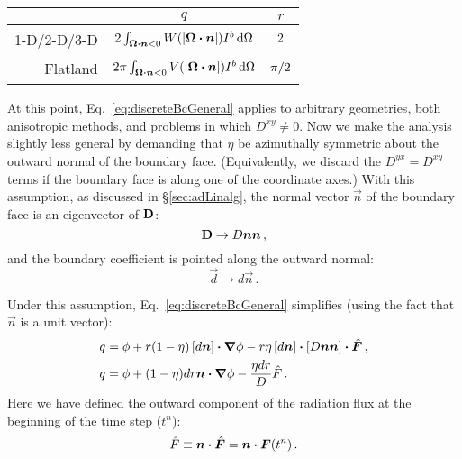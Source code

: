 \begin{table}[tb]
  \centering
  \begin{tabular}{rcc}
\toprule
& $q$
& $r$
\\ \midrule
1-D/2-D/3-D
& $2 \int_{\bm{\Omega}\bm{\cdot}\bm{n} < 0}
  W(\left| \bm{\Omega}\bm{\cdot}\bm{n} \right|) I^b \mathop{}\!\mathrm{d}\Omega$
  & $2\vphantom{\Big|}$
\\
Flatland
& $2 \pi \int_{\bm{\Omega}\bm{\cdot}\bm{n} < 0}
  V(\left| \bm{\Omega}\bm{\cdot}\bm{n} \right|) I^b \mathop{}\!\mathrm{d}\Omega$
& $\pi/2\vphantom{\Big|}$
\\ \bottomrule
  \end{tabular}
  \label{tab:discreteBcCoeffs}
\end{table}

At this point, Eq.~\eqref{eq:discreteBcGeneral} applies to arbitrary geometries,
both anisotropic methods, and problems in which $D^{xy} \ne 0$.
Now we make the analysis slightly less general by demanding
that $\eta$ be azimuthally symmetric about the outward normal of the boundary face.
(Equivalently, we discard the $D^{yx}=D^{xy}$ terms if the boundary face is
along one of the coordinate axes.) With this assumption, as discussed in
\S\ref{sec:adLinalg}, the normal vector $\vec{n}$ of the boundary face is an
eigenvector of $\mathbf{D}$:
\begin{equation*}
  \mathbf{D} \to D \bm{n}\bm{n}\,,
\end{equation*}
and the boundary coefficient is pointed along the outward normal:
\begin{equation*}
  \vec{d} \to d \vec{n}\,.
\end{equation*}

Under this assumption, Eq.~\eqref{eq:discreteBcGeneral} simplifies
(using the fact that $\vec{n}$ is a unit vector):
\begin{align} \nonumber
  q &= \phi + r (1 - \eta) \left[ d \bm{n} \right] \bm{\cdot} \bm{\nabla} \phi
  - r \eta \left[ d \bm{n} \right] \bm{\cdot} \left[ D \bm{n}\bm{n} \right] \bm{\cdot}
  \hat{\bm{F}}\,,
  \\ \label{eq:discreteBcGeneralQ}
 q &=  \phi + (1 - \eta) dr \bm{n} \bm{\cdot} \bm{\nabla} \phi
  - \frac{\eta dr}{D} \hat{F} \,.
\end{align}
Here we have defined the outward component of the radiation flux at the
beginning of the time step ($t^n$):
\begin{equation*}
  \hat{F} \equiv  \bm{n} \bm{\cdot} \hat{\bm{F}} = \bm{n} \bm{\cdot} \bm{F}(t^n)\,.
\end{equation*}

